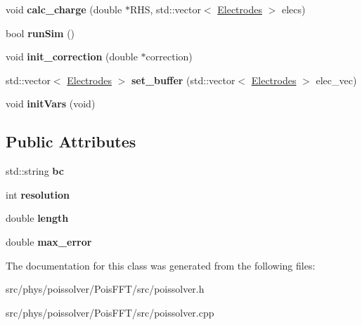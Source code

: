 \begin{DoxyCompactItemize}
\item 
void {\bfseries calc\+\_\+charge} (double $\ast$R\+HS, std\+::vector$<$ \hyperlink{classElectrodes}{Electrodes} $>$ elecs)\hypertarget{classphys_1_1PoisSolver_ac7b02a3db4c9f1e9b0918b5c334ce9f0}{}\label{classphys_1_1PoisSolver_ac7b02a3db4c9f1e9b0918b5c334ce9f0}

\item 
bool {\bfseries run\+Sim} ()\hypertarget{classphys_1_1PoisSolver_a57866b1dc7b055e361d8191a845cc126}{}\label{classphys_1_1PoisSolver_a57866b1dc7b055e361d8191a845cc126}

\item 
void {\bfseries init\+\_\+correction} (double $\ast$correction)\hypertarget{classphys_1_1PoisSolver_a527d27f3491b8878932c503703be8ee6}{}\label{classphys_1_1PoisSolver_a527d27f3491b8878932c503703be8ee6}

\item 
std\+::vector$<$ \hyperlink{classElectrodes}{Electrodes} $>$ {\bfseries set\+\_\+buffer} (std\+::vector$<$ \hyperlink{classElectrodes}{Electrodes} $>$ elec\+\_\+vec)\hypertarget{classphys_1_1PoisSolver_a90486608a646039227064372384a080c}{}\label{classphys_1_1PoisSolver_a90486608a646039227064372384a080c}

\item 
void {\bfseries init\+Vars} (void)\hypertarget{classphys_1_1PoisSolver_ae19d06eb1b6610e02e3beac8d86db842}{}\label{classphys_1_1PoisSolver_ae19d06eb1b6610e02e3beac8d86db842}

\end{DoxyCompactItemize}
\subsection*{Public Attributes}
\begin{DoxyCompactItemize}
\item 
std\+::string {\bfseries bc}\hypertarget{classphys_1_1PoisSolver_ac51108e9e50a89bc4f90e353a53cec75}{}\label{classphys_1_1PoisSolver_ac51108e9e50a89bc4f90e353a53cec75}

\item 
int {\bfseries resolution}\hypertarget{classphys_1_1PoisSolver_abdee5af7c8bc6f46cdf9ed6ad5eba03f}{}\label{classphys_1_1PoisSolver_abdee5af7c8bc6f46cdf9ed6ad5eba03f}

\item 
double {\bfseries length}\hypertarget{classphys_1_1PoisSolver_a0c6e0727209a49faf17525f225c920d2}{}\label{classphys_1_1PoisSolver_a0c6e0727209a49faf17525f225c920d2}

\item 
double {\bfseries max\+\_\+error}\hypertarget{classphys_1_1PoisSolver_a049c799d2138306e1e1290a3bc5cbf27}{}\label{classphys_1_1PoisSolver_a049c799d2138306e1e1290a3bc5cbf27}

\end{DoxyCompactItemize}


The documentation for this class was generated from the following files\+:\begin{DoxyCompactItemize}
\item 
src/phys/poissolver/\+Pois\+F\+F\+T/src/poissolver.\+h\item 
src/phys/poissolver/\+Pois\+F\+F\+T/src/poissolver.\+cpp\end{DoxyCompactItemize}
